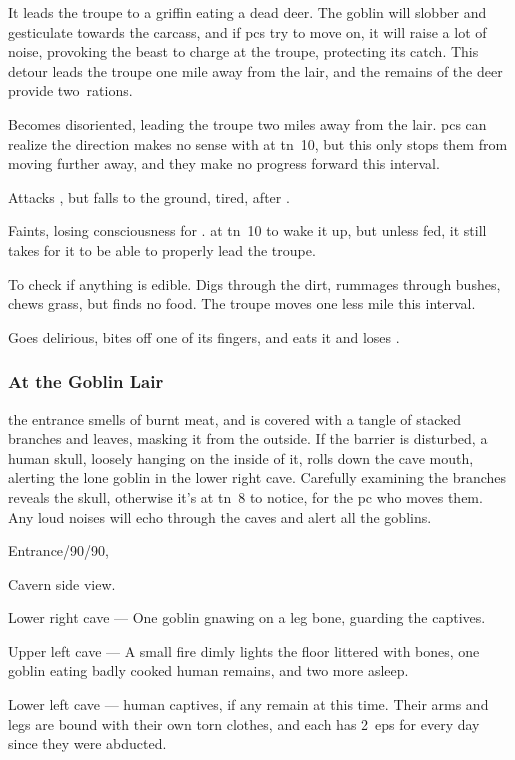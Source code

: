 \documentclass[10pt,twoside]{book}
\begin{document}
\begin{dlist}
  \item
  It leads the troupe to a griffin eating a dead deer.
  The goblin will slobber and gesticulate towards the carcass, and if \glspl{pc} try to move on, it will raise a lot of noise, provoking the beast to charge at the troupe, protecting its catch.
  This detour leads the troupe one mile away from the lair, and the remains of the deer provide two~\glspl{ration}.
  \item
  Becomes disoriented, leading the troupe two miles away from the lair.
  \glspl{pc} can realize the direction makes no sense with  at \gls{tn}~10, but this only stops them from moving further away, and they make no progress forward this \gls{interval}.
  \item
  Attacks , but falls to the ground, tired, after .
  \item
  Faints, losing consciousness for .
   at \gls{tn}~10 to wake it up, but unless fed, it still takes  for it to be able to properly lead the troupe.
  \item
  To check if anything is edible.
  Digs through the dirt, rummages through bushes, chews grass, but finds no food.
  The troupe moves one less mile this \gls{interval}.
  \item
  Goes delirious, bites off one of its fingers, and eats it and loses .
\end{dlist}


\subsubsection{At the Goblin Lair}
the entrance smells of burnt meat, and is covered with a tangle of stacked branches and leaves, masking it from the outside.
If the barrier is disturbed, a human skull, loosely hanging on the inside of it, rolls down the cave mouth, alerting the lone goblin in the lower right cave.
Carefully examining the branches reveals the skull, otherwise it's  at \gls{tn}~8 to notice, for the \gls{pc} who moves them.
Any loud noises will echo through the caves and alert all the goblins.

%
  {%
    Entrance/90/90,%
  }%
{Cavern side view.\par\null}

\goblin

\goblin

\goblin

Lower right cave --- One goblin gnawing on a leg bone, guarding the captives.

Upper left cave --- A small fire dimly lights the floor littered with bones, one goblin eating badly cooked human remains, and two more asleep.

Lower left cave --- human captives, if any remain at this time.
Their arms and legs are bound with their own torn clothes, and each has 2~\glspl{ep} for every day since they were abducted.
\end{document}
